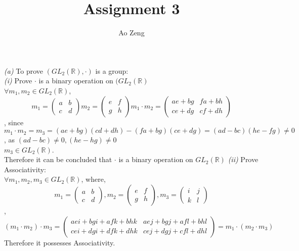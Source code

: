 \documentclass[11pt]{article}
\newenvironment{problem}[2][Problem]{\begin{trivlist}
\item[\hskip \labelsep {\bfseries #1}\hskip \labelsep {\bfseries #2.}]}{\end{trivlist}}
\begin{document}
\title{Assignment 3}
\author{Ao Zeng}
\maketitle

\begin{problem}{1}
\textit{(a)} To prove $(GL_{2}(\mathbb{R}), \cdot)$ is a group:\\
\textit{(i)} Prove $\cdot$ is a binary operation on $(GL_{2}(\mathbb{R})$\\
$\forall m_1, m_2 \in GL_{2}(\mathbb{R})$,
\[m_1 = 
    \begin{pmatrix}
    a & b\\
    c & d
    \end{pmatrix}
m_2 = 
    \begin{pmatrix}
    e & f\\
    g & h
    \end{pmatrix}
m_1 \cdot m_2 =
    \begin{pmatrix}
    ae + bg & fa + bh\\
    ce+dg & cf + dh
    \end{pmatrix}
\],
since $m_1 \cdot m_2 = m_3=(ae + bg)(cd + dh) - (fa + bg)(ce + dg) = (ad -bc)(he - fg) \neq 0$, as $(ad - bc) \neq 0, (he -hg) \neq 0$\\
$m_3 \in GL_{2}(\mathbb{R})$.\\
Therefore it can be concluded that $\cdot$ is a binary operation on $GL_{2}(\mathbb{R})$
\textit{(ii)} Prove Associativity:\\
$\forall m_1, m_2, m_3 \in GL_{2}(\mathbb{R})$, where,\
\[ m_1 = 
    \begin{pmatrix}
    a & b\\
    c & d
    \end{pmatrix}
,m_2 =
    \begin{pmatrix}
    e&f\\
    g&h
    \end{pmatrix}
,m_3 =
    \begin{pmatrix}
    i & j\\
    k & l
    \end{pmatrix}
\],\\
\[(m_1 \cdot m_2) \cdot m_3 = 
    \begin{pmatrix}
    aei + bgi + afk +bhk & aej + bgj + afl + bhl\\
    cei + dgi + dfk + dhk & cej + dgj + cfl + dhl
    \end{pmatrix}
    = m_1 \cdot (m_2 \cdot m_3)
\]
Therefore it possesses Associativity.\\

\end{problem}
\end{document}
